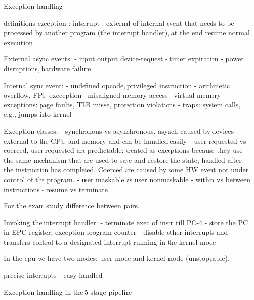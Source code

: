 

Exception handling

definitions
exception :
interrupt : external of internal event that needs to be processed by another program (the interrupt handler), at the end resume normal execution

External async events:
- input output device-request
- timer expiration
- power disruptions, hardware failure

Internal sync event:
- undefined opcode, privileged instruction
- arithmetic overflow, FPU exeception
- misaligned memory access
- virtual memory exceptions: page faults, TLB misse, protection violations
- traps: system calls, e.g., jumps into kernel

Exception classes:
- synchronous vs asynchronous, asynch caused by devices external to the CPU and memory and can be handled easily
- user requested vs coerced, user requested are predictable: treated as exceptions because they use the same mechanism that are used
to save and restore the state;
handled after the instruction has completed.
Coerced are caused by some HW event not under control of the program.
- user maskable vs user nonmaskable
- within vs between instructions
- resume vs terminate

For the exam study difference between pairs.

Invoking the interrupt handler:
- terminate exec of instr till PC-4
- store the PC in EPC register, exception program counter
- disable other interrupts and transfers control to a designated interrupt running in the kernel mode

In the cpu we have two modes: user-mode and kernel-mode (unstoppable).

precise interrupts
- easy handled

Exception handling in the 5-stage pipeline

